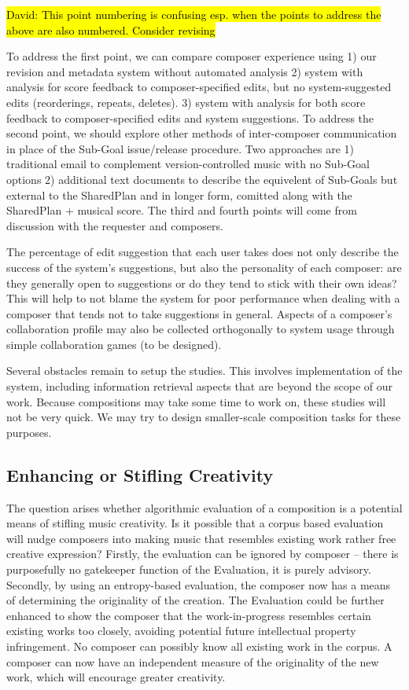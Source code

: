 \documentclass[final,authoryear,5p,times,twocolumn]{elsarticle}
\begin{document}
\hl{David: This point numbering is confusing esp. when the points to address the above are also numbered. Consider revising}

To address the first point, we can compare composer experience using 1) our revision and metadata system without automated analysis 2) system with analysis for score feedback to composer-specified edits, but no system-suggested edits (reorderings, repeats, deletes). 3) system with analysis for both score feedback to composer-specified edits and system suggestions. To address the second point, we should explore other methods of inter-composer communication in place of the Sub-Goal issue/release procedure. Two approaches are 1) traditional email to complement version-controlled music with no Sub-Goal options 2) additional text documents to describe the equivelent of Sub-Goals but external to the SharedPlan and in longer form, comitted along with the SharedPlan + musical score. The third and fourth points will come from discussion with the requester and composers.

The percentage of edit suggestion that each user takes does not only describe the success of the system's suggestions, but also the personality of each composer: are they generally open to suggestions or do they tend to stick with their own ideas? This will help to not blame the system for poor performance when dealing with a composer that tends not to take suggestions in general. Aspects of a composer's collaboration profile may also be collected orthogonally to system usage through simple collaboration games (to be designed).

Several obstacles remain to setup the studies. This involves implementation of the system, including information retrieval aspects that are beyond the scope of our work. Because compositions may take some time to work on, these studies will not be very quick. We may try to design smaller-scale composition tasks for these purposes.

\subsection{Enhancing or Stifling Creativity}

The question arises whether algorithmic evaluation of a composition is a potential means of stifling music creativity. Is it possible that a corpus based evaluation will nudge composers into making music that resembles existing work rather free creative expression? Firstly, the evaluation can be ignored by composer -- there is purposefully no gatekeeper function of the Evaluation, it is purely advisory. Secondly, by using an entropy-based evaluation, the composer now has a means of determining the originality of the creation. The Evaluation could be further enhanced to show the composer that the work-in-progress resembles certain existing works too closely, avoiding potential future intellectual property infringement. No composer can possibly know all existing work in the corpus. A composer can now have an independent measure of the originality of the new work, which will encourage greater creativity.
\end{document}
